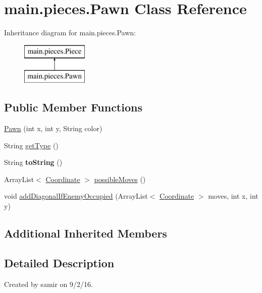 \hypertarget{classmain_1_1pieces_1_1_pawn}{}\section{main.\+pieces.\+Pawn Class Reference}
\label{classmain_1_1pieces_1_1_pawn}
Inheritance diagram for main.\+pieces.\+Pawn\+:\begin{figure}[H]
\begin{center}
\leavevmode
\includegraphics[height=2.000000cm]{classmain_1_1pieces_1_1_pawn}
\end{center}
\end{figure}
\subsection*{Public Member Functions}
\begin{DoxyCompactItemize}
\item 
\hyperlink{classmain_1_1pieces_1_1_pawn_ac0b9086627b2762dc851ae70945b0c9b}{Pawn} (int x, int y, String color)
\item 
String \hyperlink{classmain_1_1pieces_1_1_pawn_a5773cf85f79709da9dec92df7c98d64b}{get\+Type} ()
\item 
\hypertarget{classmain_1_1pieces_1_1_pawn_a9005e61dabd7be5a4755390cffda1709}{}\label{classmain_1_1pieces_1_1_pawn_a9005e61dabd7be5a4755390cffda1709} 
String {\bfseries to\+String} ()
\item 
Array\+List$<$ \hyperlink{classmain_1_1model_1_1_coordinate}{Coordinate} $>$ \hyperlink{classmain_1_1pieces_1_1_pawn_a06262375d095ccab099b861dc81bf5f1}{possible\+Moves} ()
\item 
void \hyperlink{classmain_1_1pieces_1_1_pawn_ae699e118a4a564de9d53839307f8aebe}{add\+Diagonal\+If\+Enemy\+Occupied} (Array\+List$<$ \hyperlink{classmain_1_1model_1_1_coordinate}{Coordinate} $>$ moves, int x, int y)
\end{DoxyCompactItemize}
\subsection*{Additional Inherited Members}


\subsection{Detailed Description}
Created by samir on 9/2/16. 

